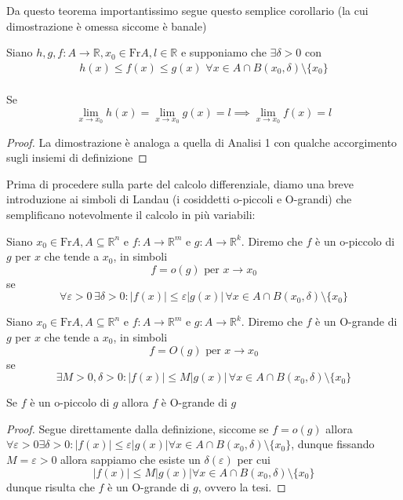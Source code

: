 \noindent Da questo teorema importantissimo segue questo semplice corollario (la cui dimostrazione è omessa siccome è banale)
\begin{theorem}
Siano $h, g, f: A \to \mathbb{R}, x_0 \in \text{Fr} A, l \in \mathbb{R}$ e supponiamo che $\exists \delta > 0$ con
\begin{align*}
h(x) \leq f(x) \leq g(x) \, \, \forall x \in A \cap B(x_0, \delta) \setminus \{ x_0 \}
\end{align*} \\
Se 
$$\lim\limits_{x \to x_0} h(x) = \lim\limits_{x \to x_0} g(x) = l \implies \lim_{x \to x_0} f(x) = l$$
\end{theorem}
\begin{proof}
La dimostrazione è analoga a quella di Analisi 1 con qualche accorgimento sugli insiemi di definizione
\end{proof}
\noindent Prima di procedere sulla parte del calcolo differenziale, diamo una breve introduzione ai simboli di Landau (i cosiddetti o-piccoli e O-grandi) che semplificano notevolmente il calcolo in più variabili:
\begin{definition}[o-piccolo]
Siano $x_0 \in \text{Fr} A, A \subseteq \mathbb{R}^n$ e $f: A \to \mathbb{R}^m$ e $g: A \to \mathbb{R}^k$. Diremo che $f$ è un o-piccolo di $g$ per $x$ che tende a $x_0$, in simboli
$$
f = o(g) \text{ per } x \to x_0
$$
se $$\forall \varepsilon > 0 \, \exists \delta > 0 : |f(x)| \leq \varepsilon |g(x)| \, \forall x \in A \cap B(x_0, \delta) \setminus \{ x_0 \}$$
\end{definition}
\begin{definition}[O-grande]
Siano $x_0 \in \text{Fr} A, A \subseteq \mathbb{R}^n$ e $f: A \to \mathbb{R}^m$ e $g: A \to \mathbb{R}^k$. Diremo che $f$ è un O-grande di $g$ per $x$ che tende a $x_0$, in simboli
$$
f = O(g) \text{ per } x \to x_0
$$
se $$\exists M > 0, \delta > 0 : |f(x)| \leq M|g(x)| \, \forall x \in A \cap B(x_0, \delta) \setminus \{ x_0 \} $$
\end{definition}
\begin{exercise}
Se $f$ è un o-piccolo di $g$ allora $f$ è O-grande di $g$
\end{exercise}
\begin{proof}
Segue direttamente dalla definizione, siccome se $f = o(g)$ allora $\forall \varepsilon > 0 \exists \delta > 0: |f(x)| \leq \varepsilon |g(x)| \forall x \in A \cap B(x_0, \delta) \setminus \{ x_0 \}$, dunque fissando $M = \varepsilon > 0$ allora sappiamo che esiste un $\delta(\varepsilon)$ per cui
$$
|f(x)| \leq M |g(x)| \forall x \in A \cap B(x_0, \delta) \setminus \{ x_0 \}
$$ 
dunque risulta che $f$ è un O-grande di $g$, ovvero la tesi.
\end{proof}
